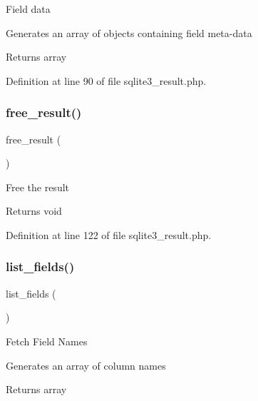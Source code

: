 Field data

Generates an array of objects containing field meta-\/data

\begin{DoxyReturn}{Returns}
array 
\end{DoxyReturn}


Definition at line 90 of file sqlite3\+\_\+result.\+php.

\mbox{\label{class_c_i___d_b__sqlite3__result_aad2d98d6beb3d6095405356c6107b473}} 
\subsubsection{\texorpdfstring{free\_result()}{free\_result()}}
{\footnotesize\ttfamily free\+\_\+result (\begin{DoxyParamCaption}{ }\end{DoxyParamCaption})}

Free the result

\begin{DoxyReturn}{Returns}
void 
\end{DoxyReturn}


Definition at line 122 of file sqlite3\+\_\+result.\+php.

\mbox{\label{class_c_i___d_b__sqlite3__result_a50b54eb4ea7cfd039740f532988ea776}} 
\subsubsection{\texorpdfstring{list\_fields()}{list\_fields()}}
{\footnotesize\ttfamily list\+\_\+fields (\begin{DoxyParamCaption}{ }\end{DoxyParamCaption})}

Fetch Field Names

Generates an array of column names

\begin{DoxyReturn}{Returns}
array 
\end{DoxyReturn}


